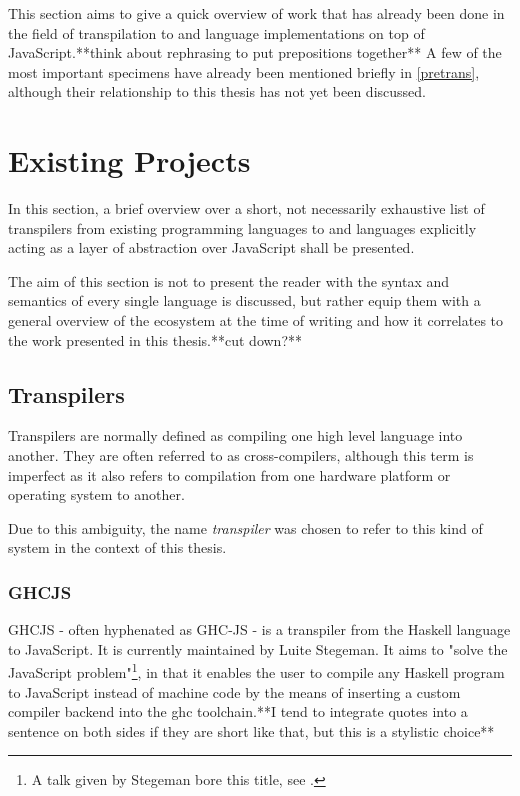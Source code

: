 \documentclass[oneside,11pt,xetex]{scrbook}
\begin{document}
This section aims to give a quick overview of work that has already been done in the
field of transpilation to and language implementations on top of JavaScript.**think about rephrasing to put prepositions together** A few
of the most important specimens have already been mentioned briefly in \ref{pretrans},
although their relationship to this thesis has not yet been discussed.

\section{Existing Projects}

In this section, a brief overview over a short, not necessarily exhaustive list of
transpilers from existing programming languages to and languages explicitly
acting as a layer of abstraction over JavaScript shall be presented.

The aim of this section is not to present the reader with the syntax and semantics
of every single language is discussed, but rather equip them with a general
overview of the ecosystem at the time of writing and how it correlates to the
work presented in this thesis.**cut down?**

\subsection{Transpilers}
\label{trans}

Transpilers are normally defined as compiling one high level language into another.
They are often referred to as cross-compilers, although this term is imperfect as
it also refers to compilation from one hardware platform or operating system to
another.

Due to this ambiguity, the name \textit{transpiler} was chosen to refer to this
kind of system in the context of this thesis.

\subsubsection{GHCJS}
\label{sec:GHCJS}

GHCJS - often hyphenated as GHC-JS - is a transpiler from the Haskell language
to JavaScript. It is currently maintained by Luite Stegeman. It aims to "solve
the JavaScript problem"\footnote{A talk given by Stegeman bore this title, see
\parencite{STEG}.}, in that it enables the user to compile any Haskell program to JavaScript
instead of machine code by the means of inserting a custom compiler backend into
the \gls{ghc} toolchain.**I tend to integrate quotes into a sentence on both sides if they are short like that, but this is a stylistic choice**
\end{document}
